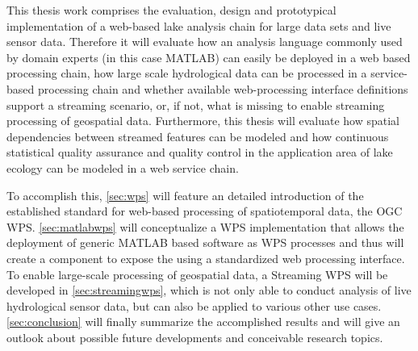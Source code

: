 This thesis work comprises the evaluation, design and prototypical implementation of a web-based lake analysis chain for large data sets and live sensor data. Therefore it will evaluate how an analysis language commonly used by domain experts (in this case MATLAB) can easily be deployed in a web based processing chain, how large scale hydrological data can be processed in a service-based processing chain and whether available web-processing interface definitions support a streaming scenario, or, if not, what is missing to enable streaming processing of geospatial data. Furthermore, this thesis will evaluate how spatial dependencies between streamed features can be modeled and how continuous statistical quality assurance and quality control in the application area of lake ecology can be modeled in a web service chain.

To accomplish this, \cref{sec:wps} will feature an detailed introduction of the established standard for web-based processing of spatiotemporal data, the OGC \acl{WPS}. \cref{sec:matlabwps} will conceptualize a WPS implementation that allows the deployment of generic MATLAB based software as WPS processes and thus will create a component to expose the \la using a standardized web processing interface. To enable large-scale processing of geospatial data, a Streaming WPS will be developed in \cref{sec:streamingwps}, which is not only able to conduct analysis of live hydrological sensor data, but can also be applied to various other use cases. \cref{sec:conclusion} will finally summarize the accomplished results and will give an outlook about possible future developments and conceivable research topics.
